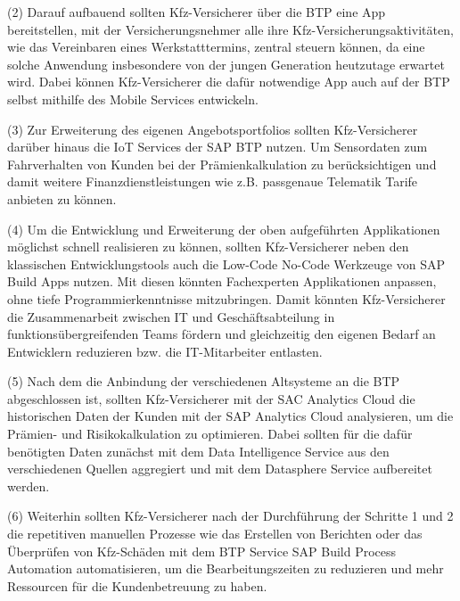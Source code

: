 (2) Darauf aufbauend sollten Kfz-Versicherer über die BTP eine App bereitstellen, mit der Versicherungsnehmer alle ihre Kfz-Versicherungsaktivitäten, wie das Vereinbaren eines Werkstatttermins, zentral steuern können, da eine solche Anwendung insbesondere von der jungen Generation heutzutage erwartet wird. Dabei können Kfz-Versicherer die dafür notwendige App auch auf der BTP selbst mithilfe des Mobile Services entwickeln.

(3) Zur Erweiterung des eigenen Angebotsportfolios sollten Kfz-Versicherer darüber hinaus die IoT Services der SAP BTP nutzen. Um Sensordaten zum Fahrverhalten von Kunden bei der Prämienkalkulation zu berücksichtigen und damit weitere Finanzdienstleistungen wie z.B. passgenaue Telematik Tarife anbieten zu können.

(4) Um die Entwicklung und Erweiterung der oben aufgeführten Applikationen möglichst schnell realisieren zu können, sollten Kfz-Versicherer neben den klassischen Entwicklungstools auch die Low-Code No-Code Werkzeuge von SAP Build Apps nutzen. Mit diesen könnten Fachexperten Applikationen anpassen, ohne tiefe Programmierkenntnisse mitzubringen. Damit könnten Kfz-Versicherer die Zusammenarbeit zwischen IT und Geschäftsabteilung in funktionsübergreifenden Teams fördern und gleichzeitig den eigenen Bedarf an Entwicklern reduzieren bzw. die IT-Mitarbeiter entlasten.

(5) Nach dem die Anbindung der verschiedenen Altsysteme an die BTP abgeschlossen ist, sollten Kfz-Versicherer mit der SAC Analytics Cloud die historischen Daten der Kunden mit der SAP Analytics Cloud analysieren, um die Prämien- und Risikokalkulation zu optimieren. Dabei sollten für die dafür benötigten Daten zunächst mit dem Data Intelligence Service aus den verschiedenen Quellen aggregiert und mit dem Datasphere Service aufbereitet werden.

(6) Weiterhin sollten Kfz-Versicherer nach der Durchführung der Schritte 1 und 2 die repetitiven manuellen Prozesse wie das Erstellen von Berichten oder das Überprüfen von Kfz-Schäden mit dem BTP Service SAP Build Process Automation automatisieren, um die Bearbeitungszeiten zu reduzieren und mehr Ressourcen für die Kundenbetreuung zu haben.




